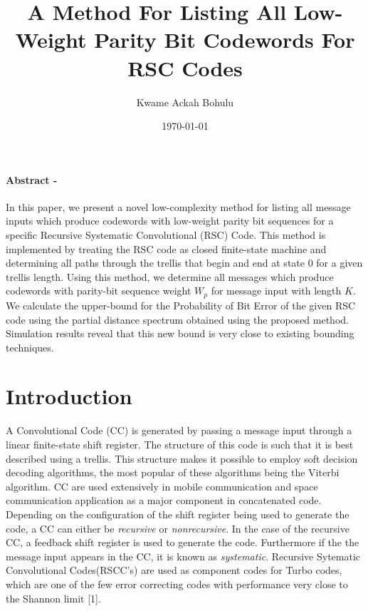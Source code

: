\documentclass[fontsize=12pt]{article}
\title{A Method For Listing All Low-Weight Parity Bit Codewords For RSC Codes}
\author{Kwame Ackah Bohulu}
\date{\today}
\begin{document}
\maketitle

\newpage
\paragraph{Abstract -}
In this paper, we present a novel low-complexity method for listing all message inputs which produce codewords with low-weight parity bit sequences for a specific Recursive Systematic Convolutional (RSC) Code.
This method is implemented by  treating the RSC code as closed finite-state machine and determining all paths through the trellis that begin and end at state 0 for a given trellis length. Using this method, we determine all messages which produce codewords with parity-bit sequence weight $W_p$ for message input with length $K$. We calculate the upper-bound for the Probability of Bit Error  of the given RSC code using the partial distance spectrum obtained using the proposed method. Simulation results reveal that this new bound is very close to existing  bounding techniques.

\section{Introduction}

A Convolutional Code (CC) is generated by passing a message input through a linear finite-state shift register. The structure of this code is such that it is best described using a trellis. This structure makes it possible to employ soft decision decoding algorithms, the most popular of these algorithms being the Viterbi algorithm. CC are used extensively in mobile communication and space communication application as a major component in concatenated code.  Depending on the configuration of the shift register being used to generate the code, a CC can either be \textit{recursive} or \textit{nonrecursive}. In the case of the recursive CC, a feedback shift register is used to generate the code. Furthermore if the the message input appears in the CC, it is known as \textit{systematic}. Recursive Sytematic Convolutional Codes(RSCC's) are used as component codes for Turbo codes, which are one of the few error correcting codes with performance very close to the Shannon limit [1].
\end{document}
